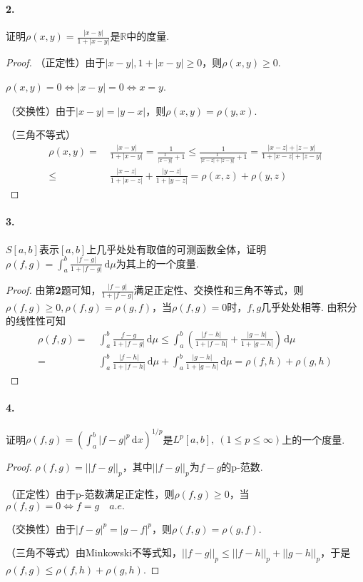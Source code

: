 \documentclass[12pt, a4paper, oneside]{ctexart}
\let\leq=\leqslant %
\let\geq=\geqslant %
\def\R{\mathbb{R}}          %
\def\d{\mathrm{d}}          %
\begin{document}
\paragraph*{2.} 证明$\rho(x, y) = \frac{|x-y|}{1+|x-y|}$是$\R$中的度量.
\begin{proof}
    （正定性）由于$|x-y|,1+|x-y|\geq 0$，则$\rho(x, y)\geq 0$.
    
    $\rho(x, y) = 0\iff |x-y| = 0\iff x=y$.

    （交换性）由于$|x-y| = |y-x|$，则$\rho(x, y) = \rho(y, x)$.

    （三角不等式）
    \begin{align*}
        \rho(x, y) =&\ \frac{|x-y|}{1+|x-y|} = \frac{1}{\frac{1}{|x-y|}+1}\leq \frac{1}{\frac{1}{|x-z|+|z-y|}+1}=\frac{|x-z|+|z-y|}{1+|x-z|+|z-y|}\\
        \leq&\ \frac{|x-z|}{1+|x-z|}+\frac{|y-z|}{1+|y-z|}= \rho(x, z) + \rho(y, z)
    \end{align*}
\end{proof}

\paragraph*{3.}$S[a,b]$表示$[a,b]$上几乎处处有取值的可测函数全体，证明$\rho(f, g) = \int_a^b\frac{|f-g|}{1+|f-g|}\,\d \mu$为其上的一个度量.
\begin{proof}
    由第\textbf{2}题可知，$\frac{|f-g|}{1+|f-g|}$满足正定性、交换性和三角不等式，则$\rho(f,g)\geq 0,\rho(f,g) = \rho(g, f)$，当$\rho(f,g)=0$时，$f,g$几乎处处相等. 由积分的线性性可知
    \begin{align*}
        \rho(f,g)=&\ \int_a^b\frac{f-g}{1+|f-g|}\,\d \mu \leq \int_a^b\left(\frac{|f-h|}{1+|f-h|}+\frac{|g-h|}{1+|g-h|}\right)\,\d\mu\\
        =&\ \int_a^b\frac{|f-h|}{1+|f-h|}\,\d\mu+\int_a^b\frac{|g-h|}{1+|g-h|}\,\d\mu=\rho(f,h)+\rho(g,h)
    \end{align*}
\end{proof}

\paragraph*{4.}证明$\rho(f,g)=\left(\int_a^b|f-g|^p\,\d x\right)^{1/p}$是$L^p[a, b],\ (1\leq p\leq \infty)$上的一个度量.
\begin{proof}
    $\rho(f,g) = ||f-g||_p$，其中$||f-g||_p$为$f-g$的p-范数.
    
    （正定性）由于p-范数满足正定性，则$\rho(f,g)\geq 0$，当$\rho(f,g)=0\iff f=g\quad a.e.$
    
    （交换性）由于$|f-g|^p = |g-f|^p$，则$\rho(f,g) = \rho(g,f)$. 

    （三角不等式）由Minkowski不等式知，$||f-g||_p\leq ||f-h||_p+||g-h||_p$，于是$\rho(f,g)\leq \rho(f,h)+\rho(g,h)$.
\end{proof}
\end{document}
